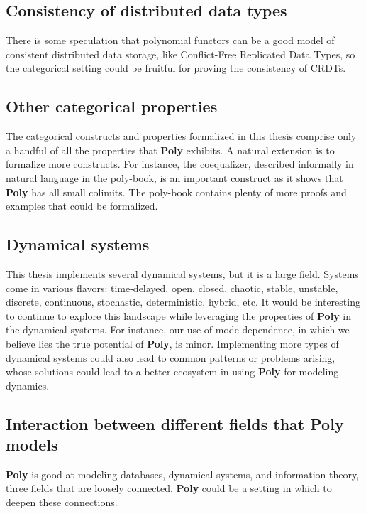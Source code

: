 \subsection{Consistency of distributed data types}

There is some speculation that polynomial functors can be a good model of consistent distributed data storage, like Conflict-Free Replicated Data Types, so the categorical setting could be fruitful for proving the consistency of CRDTs.

\subsection{Other categorical properties}
The categorical constructs and properties formalized in this thesis comprise only a handful of all the properties that \textbf{Poly} exhibits. A natural extension is to formalize more constructs. For instance, the coequalizer, described informally in natural language in the poly-book, is an important construct as it shows that \textbf{Poly} has all small colimits. The poly-book contains plenty of more proofs and examples that could be formalized. 

\subsection{Dynamical systems}
This thesis implements several dynamical systems, but it is a large field. Systems come in various flavors: time-delayed, open, closed, chaotic, stable, unstable, discrete, continuous, stochastic, deterministic, hybrid, etc. It would be interesting to continue to explore this landscape while leveraging the properties of \textbf{Poly} in the dynamical systems. For instance, our use of mode-dependence, in which we believe lies the true potential of \textbf{Poly}, is minor. Implementing more types of dynamical systems could also lead to common patterns or problems arising, whose solutions could lead to a better ecosystem in using \textbf{Poly} for modeling dynamics.

\subsection{Interaction between different fields that Poly models}

\textbf{Poly} is good at modeling databases, dynamical systems, and information theory, three fields that are loosely connected. \textbf{Poly} could be a setting in which to deepen these connections.


